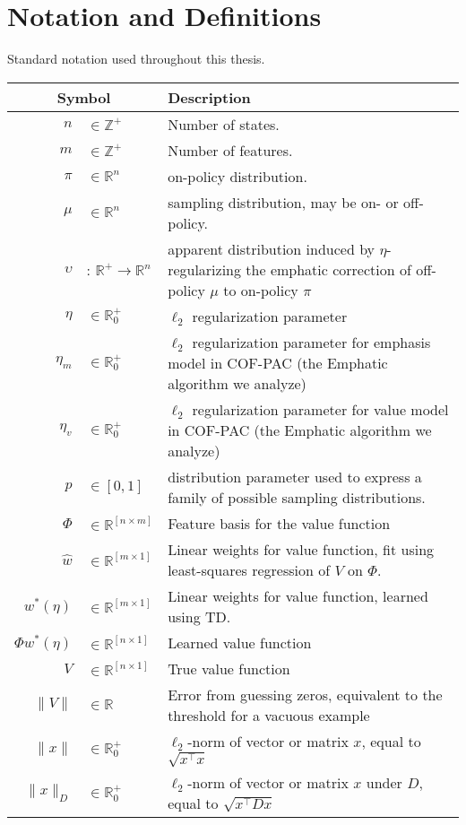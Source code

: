 \chapter{Notation and Definitions}

Standard notation used throughout this thesis.

\begin{longtable}{rl p{4in}}\hline\hline
	\multicolumn{2}{c}{Symbol} & Description
	\\\hline\endhead
	$n$                        & $\in\mathbb Z^+$ & Number of states.
	\\  $m$ & $\in\mathbb Z^+$ & Number of features.
	\\  $\pi$ & $\in\mathbb R^{n}$ & on-policy distribution.
	\\  $\mu$ & $\in\mathbb R^{n}$ & sampling distribution, may be on- or off-policy.
	\\  $\upsilon$ & : $\mathbb R^+ \to \mathbb R^{n}$ & apparent distribution induced by $\eta$-regularizing the emphatic correction of off-policy $\mu$ to on-policy $\pi$
	\\  $\eta$ & $\in \mathbb R^+_0$ & $\ell_2$ regularization parameter
	\\  $\eta_m$ & $\in \mathbb R^+_0$ & $\ell_2$ regularization parameter for emphasis model in COF-PAC (the Emphatic algorithm we analyze)
	\\  $\eta_v$ & $\in \mathbb R^+_0$ & $\ell_2$ regularization parameter for value model in COF-PAC (the Emphatic algorithm we analyze)
	\\  $p$ & $\in[0, 1]$ & distribution parameter used to express a family of possible sampling distributions.
	\\  $\Phi$ & $\in \mathbb R^{[n\times m]}$ & Feature basis for the value function
	\\  $\hat w$ & $\in \mathbb R^{[m\times 1]}$ & Linear weights for value function, fit using least-squares regression of $V$ on $\Phi$.
	\\  $w^*(\eta)$ & $\in \mathbb R^{[m\times 1]}$ & Linear weights for value function, learned using TD.
	\\  $\Phi w^*(\eta)$ & $\in \mathbb R^{[n\times 1]}$ & Learned value function
	\\  $V$ & $\in \mathbb R^{[n\times 1]}$ & True value function
	\\  $\|V\|$ & $\in \mathbb R$ & Error from guessing zeros, equivalent to the threshold for a vacuous example
	\\  $\|x\|$ & $\in\mathbb R^+_0$ & $\ell_2$-norm of vector or matrix $x$, equal to $\sqrt{x^\top x}$
	\\  $\|x\|_D$ & $\in\mathbb R^+_0$ & $\ell_2$-norm of vector or matrix $x$ under $D$, equal to $\sqrt{x^\top D x}$
	\\ \hline\hline
\end{longtable}
